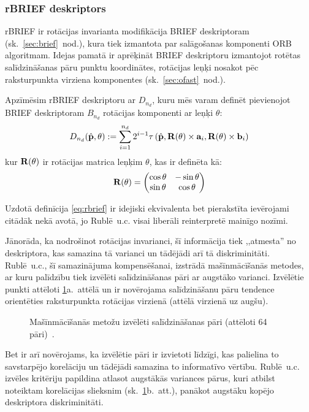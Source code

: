 \subsubsection{rBRIEF deskriptors} \label{sec:rbrief-def}
rBRIEF ir rotācijas invarianta modifikācija
BRIEF deskriptoram (sk.~\ref{sec:brief}~nod.),
kura tiek izmantota par salāgošanas komponenti ORB
algoritmam. Idejas pamatā ir aprēķināt BRIEF deskriptoru izmantojot
rotētas salīdzināšanas pāru punktu koordinātes, rotācijas leņķi nosakot pēc
raksturpunkta virziena komponentes (sk.~\ref{sec:ofast}~nod.).

Apzīmēsim rBRIEF deskriptoru ar $D_{n_d}$, kuru mēs varam definēt
pievienojot BRIEF deskriptoram $B_{n_d}$ rotācijas komponenti ar leņķi $\theta$:
\begin{equation}\label{eq:rbrief}
	D_{n_d}(\hat{\mathbf{p}}, \theta) := \sum_{i=1}^{n_d} 2^{i-1}
		\tau\left(\hat{\mathbf{p}},
		          \mathbf{R}(\theta) \times \mathbf{a}_i,
		          \mathbf{R}(\theta) \times \mathbf{b}_i\right)
\end{equation}
kur $\mathbf{R}(\theta)$ ir rotācijas matrica leņķim $\theta$, kas ir definēta kā:
\[
	\mathbf{R}(\theta) = 
		\begin{pmatrix}
			\cos\theta & -\sin\theta\\
			\sin\theta & \cos\theta
		\end{pmatrix}
\]

Uzdotā definīcija \eqref{eq:rbrief} ir idejiski ekvivalenta bet 
pierakstīta ievērojami citādāk nekā \cite{ORB} avotā, jo 
Rublē~u.c. visai liberāli reinterpretē mainīgo nozīmi.

Jānorāda, ka nodrošinot rotācijas invarianci, šī informācija tiek
,,atmesta'' no deskriptora, kas samazina tā varianci un tādējādi arī
tā diskriminitāti. Rublē~u.c.\cite{ORB}, šī samazinājuma kompensēšanai,
izstrādā mašīnmācīšanās metodes, ar kuru palīdzību tiek izvēlēti
salīdzināšanas pāri ar augstāko varianci. Izvēlētie punkti attēloti
\ref{fig:pattern2}a.~attēlā un ir novērojama salīdzināšanu pāru tendence
orientēties raksturpunkta rotācijas virzienā (attēlā virzienā uz augšu).
\begin{figure}[tbh]
	\centering
	\def\svgwidth{0.7\linewidth}
	{}
	\caption{Mašīnmācīšanās metožu izvēlēti salīdzināšanas pāri
		(attēloti 64 pāri)~\cite{ORB}.}
	\label{fig:pattern2}
\end{figure}
Bet ir arī novērojams, ka izvēlētie pāri ir izvietoti līdzīgi, kas palielina
to savstarpējo korelāciju
un tādējādi samazina to informatīvo vērtību. Rublē~u.c.\cite{ORB} izvēles
kritēriju papildina atlasot augstākās variances pārus, kuri atbilst
noteiktam korelācijas slieksnim (sk.~\ref{fig:pattern2}b.~att.), panākot
augstāku kopējo deskriptora diskriminitāti.
